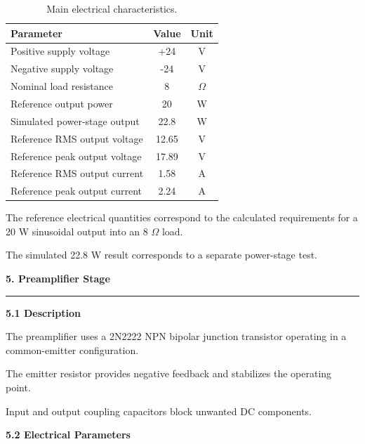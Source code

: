 \documentclass[10pt,letterpaper]{article}
\newcommand{\datasheetsection}[1]{
    \vspace{0.3cm}
    {\large\bfseries\color{datasheetblue}#1}
    \par\vspace{0.1cm}
    \hrule
    \vspace{0.15cm}
}
\newcommand{\datasheetsubsection}[1]{
    \vspace{0.15cm}
    {\normalsize\bfseries\color{datasheetblue}#1}
    \par
}
\begin{document}
\begin{table}[htbp]
\centering
\small

\begin{tabular}{p{7.2cm}cc}
\hline
\textbf{Parameter} &
\textbf{Value} &
\textbf{Unit}\\
\hline

Positive supply voltage & +24 & V\\

Negative supply voltage & -24 & V\\

Nominal load resistance & 8 & $\Omega$\\

Reference output power & 20 & W\\

Simulated power-stage output & 22.8 & W\\

Reference RMS output voltage & 12.65 & V\\

Reference peak output voltage & 17.89 & V\\

Reference RMS output current & 1.58 & A\\

Reference peak output current & 2.24 & A\\

\hline
\end{tabular}

\caption{Main electrical characteristics.}
\end{table}

The reference electrical quantities correspond
to the calculated requirements for a
20 W sinusoidal output into an 8 $\Omega$ load.

The simulated 22.8 W result corresponds
to a separate power-stage test.

\datasheetsection{5. Preamplifier Stage}

\datasheetsubsection{5.1 Description}

The preamplifier uses a 2N2222 NPN
bipolar junction transistor operating
in a common-emitter configuration.

The emitter resistor provides
negative feedback and stabilizes
the operating point.

Input and output coupling capacitors
block unwanted DC components.

\datasheetsubsection{5.2 Electrical Parameters}
\end{document}
